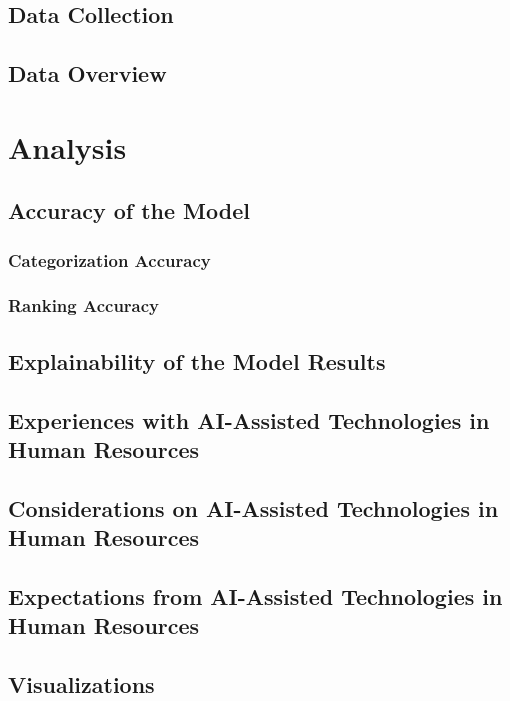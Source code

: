 \documentclass[draft,final]{thesisclass} %
\begin{document}
\section{Data Collection}
\lipsum[1]

\section{Data Overview}
\lipsum[1]

\chapter{Analysis}

\section{Accuracy of the Model}

\subsection{Categorization Accuracy}
\lipsum[1]

\subsection{Ranking Accuracy}
\lipsum[1]

\section{Explainability of the Model Results}
\lipsum[1]

\section{Experiences with AI-Assisted Technologies in Human Resources}
\lipsum[1]

\section{Considerations on AI-Assisted Technologies in Human Resources}
\lipsum[1]

\section{Expectations from AI-Assisted Technologies in Human Resources}
\lipsum[1]

\section{Visualizations}
\lipsum[1]
\end{document}
